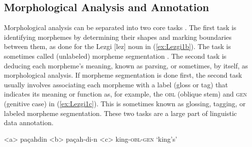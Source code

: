 \documentclass[12pt]{article}
\begin{document}
\subsection{Morphological Analysis and Annotation}
\label{analysis}

Morphological analysis can be separated into two core tasks \cite{cotterell_labeled_2015,hammarstrom_unsupervised_2011,nicolai_morphological_2017,palmer_semi-automated_2009}. The first task is identifying morphemes by determining their shapes and marking boundaries between them, as done for the Lezgi [lez] noun in (\ref{ex:Lezgi1b}). The task is sometimes called (unlabeled) morpheme segmentation \cite{creutz_unsupervised_2007,snyder_unsupervised_2008}. The second task is deducing each morpheme's meaning, known as parsing, or sometimes, by itself, as morphological analysis. If morpheme segmentation is done first, the second task usually involves associating each morpheme with a label (gloss or tag) that indicates its meaning or function as, for example, the \textsc{obl} (oblique stem) and \textsc{gen} (genitive case) in (\ref{ex:Lezgi1c}). This is sometimes known as glossing, tagging, or labeled morpheme segmentation. These two tasks are a large part of linguistic data annotation. 

\begin{singlespace}


\label{ex:Lezgi1}
\a<a> pa\c{c}ahdin 
\label{ex:Lezgi1a}
\a<b> pa\c{c}ah-di-n 
\label{ex:Lezgi1b}
\a<c> king-\textsc{obl}-\textsc{gen} 
\label{ex:Lezgi1c}
\a `king's'
\label{ex:Lezgi1d}
\xe

\end{singlespace}
\end{document}
